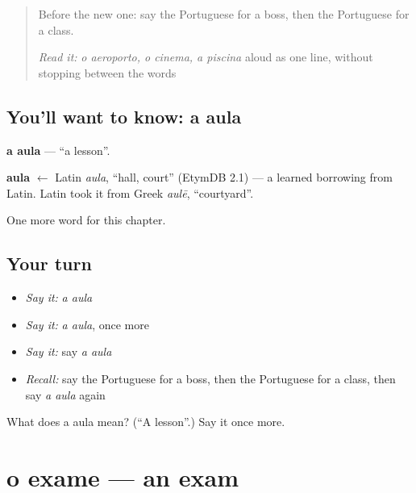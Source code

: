 \label{lesson:PT-C112-aula}



\begin{quote}
Before the new one: say the Portuguese for a boss, then the Portuguese for a class.

\emph{Read it:} \emph{o aeroporto, o cinema, a piscina} aloud as one line, without stopping between the words
\end{quote}

\subsection*{You'll want to know: a aula}
\textbf{a aula} — \textquotedblleft{}a lesson\textquotedblright{}.

\begin{cousinweb}
\textbf{aula} $\leftarrow$ Latin \emph{aula}, \textquotedblleft{}hall, court\textquotedblright{} (EtymDB 2.1) — a learned borrowing from Latin. Latin took it from Greek \emph{aulē}, \textquotedblleft{}courtyard\textquotedblright{}.
\end{cousinweb}

\begin{grammarlens}[title={What you've built}]
One more word for this chapter.
\end{grammarlens}

\subsection*{Your turn}
\begin{itemize}
\raggedright
  \item \emph{Say it:} \emph{a aula}
  \item \emph{Say it:} \emph{a aula}, once more
  \item \emph{Say it:} say \emph{a aula}
  \item \emph{Recall:} say the Portuguese for a boss, then the Portuguese for a class, then say \emph{a aula} again
\end{itemize}

\begin{tcolorbox}[breakable,colback=teal!4,colframe=teal!35!black,title={Before you move on}]
What does a aula mean? (\textquotedblleft{}A lesson\textquotedblright{}.) Say it once more.
\end{tcolorbox}
\section[o exame]{o exame — an exam}

